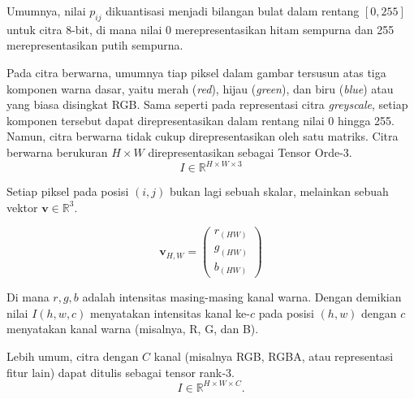 Umumnya, nilai $p_{ij}$ dikuantisasi menjadi bilangan bulat dalam rentang $[0,255]$ untuk citra 8-bit, di mana nilai 0 merepresentasikan hitam sempurna dan 255 merepresentasikan putih sempurna.

Pada citra berwarna, umumnya tiap piksel dalam gambar tersusun atas tiga komponen warna dasar, yaitu merah (\textit{red}), hijau (\textit{green}), dan biru (\textit{blue}) atau yang biasa disingkat RGB. 
Sama seperti pada representasi citra \textit{greyscale}, setiap komponen tersebut dapat direpresentasikan dalam rentang nilai 0 hingga 255.
Namun, citra berwarna tidak cukup direpresentasikan oleh satu matriks. Citra berwarna berukuran $H \times W$ direpresentasikan sebagai Tensor Orde-3.
$$
I \in \mathbb{R}^{H \times W \times 3}
$$ 

Setiap piksel pada posisi $(i, j)$ bukan lagi sebuah skalar, melainkan sebuah vektor $\textbf{v} \in \mathbb{R}^{3}$.

$$
\mathbf{v}_{H, W} = 
\begin{pmatrix}
r_{(HW)} \\
g_{(HW)} \\
b_{(HW)} 
\end{pmatrix}
$$

Di mana  $r, g, b$ adalah intensitas masing-masing kanal warna. Dengan demikian nilai $I(h, w, c)$ menyatakan intensitas kanal ke-$c$ pada posisi $(h, w)$ dengan $c$ menyatakan kanal warna (misalnya, R, G, dan B).

Lebih umum, citra dengan \(C\) kanal (misalnya RGB, RGBA, atau representasi fitur lain) dapat ditulis sebagai tensor rank‑3.
$$
I \in \mathbb{R}^{H \times W \times C}.
$$
